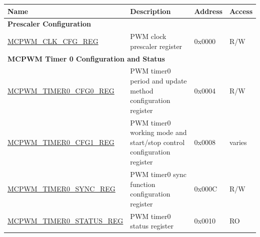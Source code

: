 \begin{longtable}{ | p{6cm} | p{7.2cm} | p{1.3cm} | p{1cm} | }
\hline\rowcolor{lightgray}
Name & Description &  Address & Access \\ \hline
\endhead
\multicolumn{4}{|l|}{\textbf{Prescaler Configuration}} \\ \hline
\hyperref[regdesc:MCPWMCLKCFGREG]{MCPWM\_CLK\_CFG\_REG} & PWM clock prescaler register & 0x0000 & R/W \\ \hline
\multicolumn{4}{|l|}{\textbf{MCPWM Timer 0 Configuration and Status}} \\ \hline
\hyperref[regdesc:MCPWMTIMERNCFG0REG]{MCPWM\_TIMER0\_CFG0\_REG} & PWM timer0 period and update method configuration register & 0x0004 & R/W \\ \hline
\hyperref[regdesc:MCPWMTIMERNCFG1REG]{MCPWM\_TIMER0\_CFG1\_REG} & PWM timer0 working mode and start/stop control configuration register & 0x0008 & varies \\ \hline
\hyperref[regdesc:MCPWMTIMERNSYNCREG]{MCPWM\_TIMER0\_SYNC\_REG} & PWM timer0 sync function configuration register & 0x000C & R/W \\ \hline
\hyperref[regdesc:MCPWMTIMERNSTATUSREG]{MCPWM\_TIMER0\_STATUS\_REG} & PWM timer0 status register & 0x0010 & RO \\ \hline


\end{longtable}
